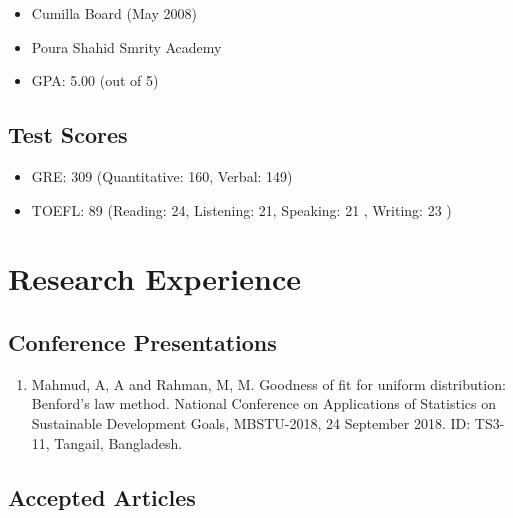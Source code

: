 \documentclass[
]{book}
\providecommand{\tightlist}{%
  \setlength{\itemsep}{0pt}\setlength{\parskip}{0pt}}
\begin{document}
\begin{itemize}
\tightlist
\item
  Cumilla Board (May 2008)
\item
  Poura Shahid Smrity Academy
\item
  GPA: 5.00 (out of 5)
\end{itemize}

\hypertarget{test-scores}{%
\section*{Test Scores}\label{test-scores}}

\begin{itemize}
\tightlist
\item
  GRE: 309 (Quantitative: 160, Verbal: 149)
\item
  TOEFL: 89 (Reading: 24, Listening: 21, Speaking: 21 , Writing: 23 )
\end{itemize}

\hypertarget{research-experience}{%
\chapter*{Research Experience}\label{research-experience}}

\hypertarget{conference-presentations}{%
\section*{Conference Presentations}\label{conference-presentations}}

\begin{enumerate}
\def\labelenumi{\arabic{enumi}.}
\tightlist
\item
  Mahmud, A, A and Rahman, M, M. Goodness of fit for uniform distribution:
  Benford's law method. National Conference on Applications of Statistics on
  Sustainable Development Goals, MBSTU-2018, 24 September 2018. ID: TS3-11,
  Tangail, Bangladesh.
\end{enumerate}

\hypertarget{accepted-articles}{%
\section*{Accepted Articles}\label{accepted-articles}}
\end{document}

